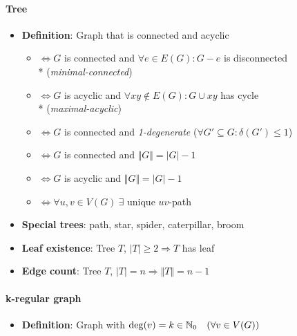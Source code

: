 \paragraph{Tree}
\begin{itemize}
  \item \textbf{Definition}: Graph that is connected and acyclic
  \begin{itemize}
    \item $ \Leftrightarrow G $ is connected and $ \forall e \in E(G): G-e $ is disconnected  \\*
      \phantom{$ \Leftrightarrow $} (\emph{minimal-connected})
    \item $ \Leftrightarrow G $ is acyclic and $ \forall xy \not \in E(G) : G \cup xy $ has cycle \\*
      \phantom{$ \Leftrightarrow $} (\emph{maximal-acyclic})
    \item $ \Leftrightarrow G $ is connected and \emph{1-degenerate} ($ \forall G' \subseteq G : \delta(G') \leq 1 $) 
    \item $ \Leftrightarrow G $ is connected and $ \Vert G \Vert = \vert G \vert - 1 $
    \item $ \Leftrightarrow G $ is acyclic and $ \Vert G \Vert = \vert G \vert - 1 $
    \item $ \Leftrightarrow \forall u,v \in V(G) \ \exists $ unique $ uv $-path
  \end{itemize}
  \item \textbf{Special trees}: path, star, spider, caterpillar, broom
  \item \textbf{Leaf existence}: Tree $ T $, $ \vert T \vert \geq 2 \Rightarrow T $ has leaf
  \item \textbf{Edge count}: Tree $ T $, $ \vert T \vert = n \Rightarrow \Vert T \Vert = n-1 $ 
\end{itemize}

\paragraph{k-regular graph}
\begin{itemize}
  \item \textbf{Definition}: Graph with $ \deg(v) = k \in \mathbb{N}_0 \quad (\forall v \in V(G)) $
\end{itemize}




